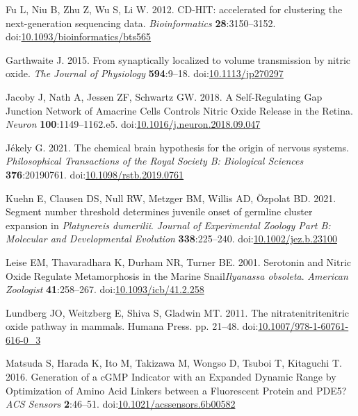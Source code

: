 \documentclass[
  10pt,
  onecolumn]{article}
\newlength{\cslhangindent}
\newlength{\cslentryspacingunit} %
\newenvironment{CSLReferences}[2] %
 {%
  \setlength{\parindent}{0pt}
  \ifodd #1
  \let\oldpar\par
  \def\par{\hangindent=\cslhangindent\oldpar}
  \fi
  \setlength{\parskip}{#2\cslentryspacingunit}
 }%
 {}
\begin{document}
\begin{CSLReferences}{1}{0}
\leavevmode{}%
Fu L, Niu B, Zhu Z, Wu S, Li W. 2012. CD-HIT: accelerated for clustering
the next-generation sequencing data. \emph{Bioinformatics}
\textbf{28}:3150--3152.
doi:\href{https://doi.org/10.1093/bioinformatics/bts565}{10.1093/bioinformatics/bts565}

\leavevmode{}%
Garthwaite J. 2015. From synaptically localized to volume transmission
by nitric oxide. \emph{The Journal of Physiology} \textbf{594}:9--18.
doi:\href{https://doi.org/10.1113/jp270297}{10.1113/jp270297}

\leavevmode{}%
Jacoby J, Nath A, Jessen ZF, Schwartz GW. 2018. A Self-Regulating Gap
Junction Network of Amacrine Cells Controls Nitric Oxide Release in the
Retina. \emph{Neuron} \textbf{100}:1149--1162.e5.
doi:\href{https://doi.org/10.1016/j.neuron.2018.09.047}{10.1016/j.neuron.2018.09.047}

\leavevmode{}%
Jékely G. 2021. The chemical brain hypothesis for the origin of nervous
systems. \emph{Philosophical Transactions of the Royal Society B:
Biological Sciences} \textbf{376}:20190761.
doi:\href{https://doi.org/10.1098/rstb.2019.0761}{10.1098/rstb.2019.0761}

\leavevmode{}%
Kuehn E, Clausen DS, Null RW, Metzger BM, Willis AD, Özpolat BD. 2021.
Segment number threshold determines juvenile onset of germline cluster
expansion in {\emph{Platynereis dumerilii}}. \emph{Journal of
Experimental Zoology Part B: Molecular and Developmental Evolution}
\textbf{338}:225--240.
doi:\href{https://doi.org/10.1002/jez.b.23100}{10.1002/jez.b.23100}

\leavevmode{}%
Leise EM, Thavaradhara K, Durham NR, Turner BE. 2001. Serotonin and
Nitric Oxide Regulate Metamorphosis in the Marine Snail{\emph{Ilyanassa
obsoleta}}. \emph{American Zoologist} \textbf{41}:258--267.
doi:\href{https://doi.org/10.1093/icb/41.2.258}{10.1093/icb/41.2.258}

\leavevmode{}%
Lundberg JO, Weitzberg E, Shiva S, Gladwin MT. 2011. The
nitrate{\textendash}nitrite{\textendash}nitric oxide pathway in mammals.
Humana Press. pp. 21--48.
doi:\href{https://doi.org/10.1007/978-1-60761-616-0_3}{10.1007/978-1-60761-616-0\_3}

\leavevmode{}%
Matsuda S, Harada K, Ito M, Takizawa M, Wongso D, Tsuboi T, Kitaguchi T.
2016. Generation of a cGMP Indicator with an Expanded Dynamic Range by
Optimization of Amino Acid Linkers between a Fluorescent Protein and
PDE5? \emph{ACS Sensors} \textbf{2}:46--51.
doi:\href{https://doi.org/10.1021/acssensors.6b00582}{10.1021/acssensors.6b00582}


\end{CSLReferences}
\end{document}
